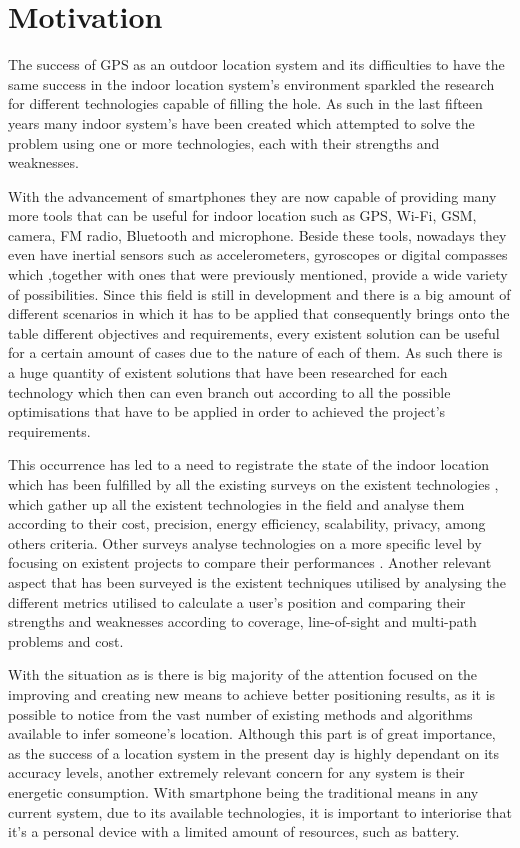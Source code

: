 \section{Motivation}
\label{sec:int_motivation}

The success of \ac{GPS} as an outdoor location system and its difficulties to have the same success in the indoor location system's environment sparkled the research for different technologies capable of filling the hole. As such in the last fifteen years many indoor system's have been created which attempted to solve the problem using one or more technologies, each with their strengths and weaknesses. 

With the advancement of smartphones they are now capable of providing many more tools that can be useful for indoor location such as GPS, Wi-Fi, GSM, camera, FM radio, Bluetooth and microphone. Beside these tools, nowadays they even have inertial sensors such as accelerometers, gyroscopes or digital compasses which ,together with ones that were previously mentioned, provide a wide variety of possibilities. Since this field is still in development and there is a big amount of different scenarios in which it has to be applied that consequently brings onto the table different objectives and requirements, every existent solution can be useful for a certain amount of cases due to the nature of each of them. As such there is a huge quantity of existent solutions that have been researched for each technology which then can even branch out according to all the possible optimisations that have to be applied in order to achieved the project's requirements.

This occurrence has led to a need to registrate the state of the indoor location which has been fulfilled by all the existing surveys on the existent technologies \cite{survey1, surveythesis}, which gather up all the existent technologies in the field and analyse them according to their cost, precision, energy efficiency, scalability, privacy, among others criteria. Other surveys analyse technologies on a more specific level by focusing on existent projects to compare their performances \cite{surveywireless}. Another relevant aspect that has been surveyed is the existent techniques utilised \cite{reviewtechniques, survey2, survey3} by analysing the different metrics utilised to calculate a user's position and comparing their strengths and weaknesses according to coverage, line-of-sight and multi-path problems and cost.  

With the situation as is there is big majority of the attention focused on the improving and creating new means to achieve better positioning results, as it is possible to notice from the vast number of existing methods and algorithms available to infer someone's location. Although this part is of great importance, as the success of a location system in the present day is highly dependant on its accuracy levels, another extremely relevant concern for any system is their energetic consumption. With smartphone being the traditional means in any current system, due to its available technologies, it is important to interiorise that it's a personal device with a limited amount of resources, such as battery. 


